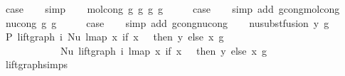 \begin{isabellebody}
\ {\isacharquery}{\kern0pt}case\isanewline
\ \ \isamarkupfalse%
\ simp\isanewline
{}\isamarkupfalse%
\isanewline
\ \ \isamarkupfalse%
\ {\isacharparenleft}{\kern0pt}mol{\isacharunderscore}{\kern0pt}cong\ g{}\ g{}{\isacharprime}{\kern0pt}\ g{}\ g{}{\isacharprime}{\kern0pt}{\isacharparenright}{\kern0pt}\isanewline
\ \ \isamarkupfalse%
\ \isamarkupfalse%
\ {\isacharquery}{\kern0pt}case\isanewline
\ \ \isamarkupfalse%
\ {\isacharparenleft}{\kern0pt}simp\ add{\isacharcolon}{\kern0pt}\ gcong{\isachardot}{\kern0pt}mol{\isacharunderscore}{\kern0pt}cong{\isacharparenright}{\kern0pt}\isanewline
{}\isamarkupfalse%
\isanewline
\ \ \isamarkupfalse%
\ {\isacharparenleft}{\kern0pt}nu{\isacharunderscore}{\kern0pt}cong\ g\ g{\isacharprime}{\kern0pt}{\isacharparenright}{\kern0pt}\isanewline
\ \ \isamarkupfalse%
\ \isamarkupfalse%
\ {\isacharquery}{\kern0pt}case\isanewline
\ \ \isamarkupfalse%
\ {\isacharparenleft}{\kern0pt}simp\ add{\isacharcolon}{\kern0pt}\ gcong{\isachardot}{\kern0pt}nu{\isacharunderscore}{\kern0pt}cong{\isacharparenright}{\kern0pt}\isanewline
{}\isamarkupfalse%
\isanewline
\ \ \isamarkupfalse%
\ {\isacharparenleft}{\kern0pt}nu{\isacharunderscore}{\kern0pt}subst{\isacharunderscore}{\kern0pt}fusion{}\ y\ g{\isacharparenright}{\kern0pt}\isanewline
\ \ \isamarkupfalse%
\ P{}{\isacharcolon}{\kern0pt}\ {\isachardoublequoteopen}lift{\isacharunderscore}{\kern0pt}graph\ i\ {\isacharparenleft}{\kern0pt}Nu\ {\isacharparenleft}{\kern0pt}lmap\ {\isacharparenleft}{\kern0pt}{\isasymlambda}x{\isachardot}{\kern0pt}\ if\ x\ {\isacharequal}{\kern0pt}\ {}\ then\ y\ else\ x{\isacharparenright}{\kern0pt}\ g{\isacharparenright}{\kern0pt}{\isacharparenright}{\kern0pt}\ {\isacharequal}{\kern0pt}\isanewline
\ \ \ \ \ \ \ \ \ \ \ \ Nu\ {\isacharparenleft}{\kern0pt}lift{\isacharunderscore}{\kern0pt}graph\ i\ {\isacharparenleft}{\kern0pt}lmap\ {\isacharparenleft}{\kern0pt}{\isasymlambda}x{\isachardot}{\kern0pt}\ if\ x\ {\isacharequal}{\kern0pt}\ {}\ then\ y\ else\ x{\isacharparenright}{\kern0pt}\ g{\isacharparenright}{\kern0pt}{\isacharparenright}{\kern0pt}{\isachardoublequoteclose}\isanewline
\ \ \ \ \ \ \isamarkupfalse%
\ lift{\isacharunderscore}{\kern0pt}graph{\isachardot}{\kern0pt}simps{\isacharparenleft}{\kern0pt}{}{\isacharparenright}{\kern0pt}\ \isamarkupfalse%

\end{isabellebody}
